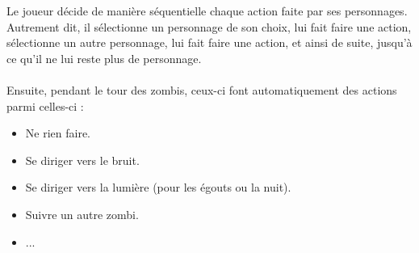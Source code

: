 Le joueur décide de manière séquentielle chaque action faite par ses personnages. Autrement dit, il sélectionne un personnage de son choix, lui fait faire une action, sélectionne un autre personnage, lui fait faire une action, et ainsi de suite, jusqu'à ce qu'il ne lui reste plus de personnage.
\\\\
Ensuite, pendant le tour des zombis, ceux-ci font automatiquement des actions parmi celles-ci :
\begin{itemize}
  \item Ne rien faire.
  \item Se diriger vers le bruit.
  \item Se diriger vers la lumière (pour les égouts ou la nuit).
  \item Suivre un autre zombi.
  \item ...
\end{itemize}